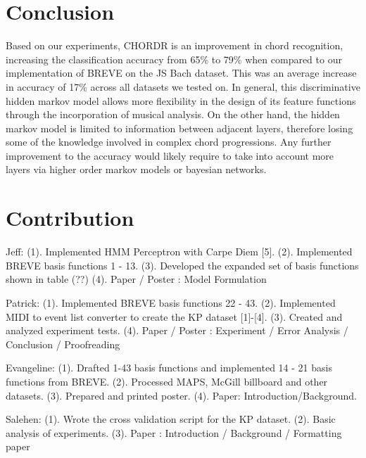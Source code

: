 \documentclass{article} %
\begin{document}
\section{Conclusion}

Based on our experiments, CHORDR is an improvement in chord recognition, increasing the classification accuracy from 65\% to 79\% when compared to our implementation of BREVE on the JS Bach dataset. This was an average increase in accuracy of 17\% across all datasets we tested on. In general, this discriminative hidden markov model allows more flexibility in the design of its feature functions through the incorporation of musical analysis. On the other hand, the hidden markov model is limited to information between adjacent layers, therefore losing some of the knowledge involved in complex chord progressions. Any further improvement to the accuracy would likely require to take into account more layers via higher order markov models or bayesian networks.

\section{Contribution}

Jeff: (1). Implemented HMM Perceptron with Carpe Diem [5]. (2). Implemented BREVE basis functions 1 - 13. (3). Developed the expanded set of basis functions shown in table (??) (4). Paper / Poster : Model Formulation

Patrick: (1). Implemented BREVE basis functions 22 - 43. (2). Implemented MIDI to event list converter to create the KP dataset [1]-[4]. (3). Created and analyzed experiment tests. (4). Paper / Poster : Experiment / Error Analysis / Conclusion / Proofreading

Evangeline: (1). Drafted 1-43 basis functions and implemented 14 - 21 basis functions from BREVE. (2). Processed MAPS, McGill billboard and other datasets. (3). Prepared and printed poster. (4). Paper: Introduction/Background.

Salehen: (1). Wrote the cross validation script for the KP dataset. (2). Basic analysis of experiments. (3). Paper : Introduction / Background / Formatting paper
\end{document}
